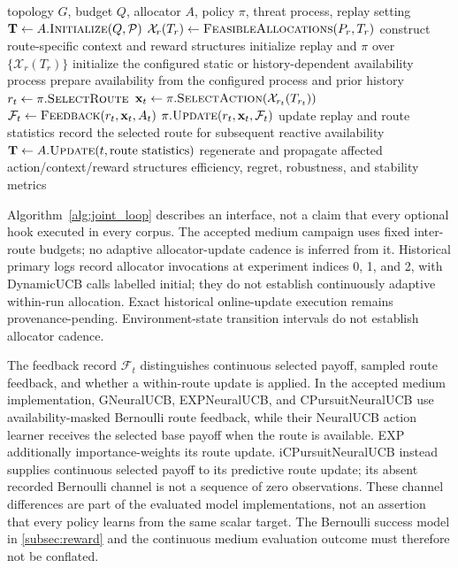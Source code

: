 \begin{algorithm}[t]
\caption{Shared routing and within-route allocation decision loop}
\label{alg:joint_loop}
\begin{algorithmic}[1]
\scriptsize
\Require topology $G$, budget $Q$, allocator $A$, policy $\pi$, threat process, replay setting
\State $\mathbf{T}\gets A.\Call{Initialize}{Q,\mathcal{P}}$
  \State $\mathcal{X}_r(T_r)\gets\Call{FeasibleAllocations}{P_r,T_r}$
  \State construct route-specific context and reward structures
\EndFor
\State initialize replay and $\pi$ over $\{\mathcal{X}_r(T_r)\}$
\State initialize the configured static or history-dependent availability process
  \State prepare availability from the configured process and prior history
  \State $r_t\gets\pi.\Call{SelectRoute}{}$ 
  \State $\mathbf{x}_t\gets\pi.\Call{SelectAction}{\mathcal{X}_{r_t}(T_{r_t})}$ 
  \State $\mathcal{F}_t\gets\Call{Feedback}{r_t,\mathbf{x}_t,A_t}$
  \State $\pi.\Call{Update}{r_t,\mathbf{x}_t,\mathcal{F}_t}$ 
  \State update replay and route statistics
  \State record the selected route for subsequent reactive availability
    \State $\mathbf{T}\gets A.\Call{Update}{t,\text{route statistics}}$
    \State regenerate and propagate affected action/context/reward structures
  \EndIf
\EndFor
\State \Return efficiency, regret, robustness, and stability metrics
\end{algorithmic}
\end{algorithm}

Algorithm~\ref{alg:joint_loop} describes an interface, not a claim that every optional hook executed in every corpus. The accepted medium campaign uses fixed inter-route budgets; no adaptive allocator-update cadence is inferred from it. Historical primary logs record allocator invocations at experiment indices 0, 1, and 2, with DynamicUCB calls labelled initial; they do not establish continuously adaptive within-run allocation. Exact historical online-update execution remains provenance-pending. Environment-state transition intervals do not establish allocator cadence.

The feedback record $\mathcal{F}_t$ distinguishes continuous selected payoff, sampled route feedback, and whether a within-route update is applied. In the accepted medium implementation, GNeuralUCB, EXPNeuralUCB, and CPursuitNeuralUCB use availability-masked Bernoulli route feedback, while their NeuralUCB action learner receives the selected base payoff when the route is available. EXP additionally importance-weights its route update. iCPursuitNeuralUCB instead supplies continuous selected payoff to its predictive route update; its absent recorded Bernoulli channel is not a sequence of zero observations. These channel differences are part of the evaluated model implementations, not an assertion that every policy learns from the same scalar target. The Bernoulli success model in \cref{subsec:reward} and the continuous medium evaluation outcome must therefore not be conflated.

